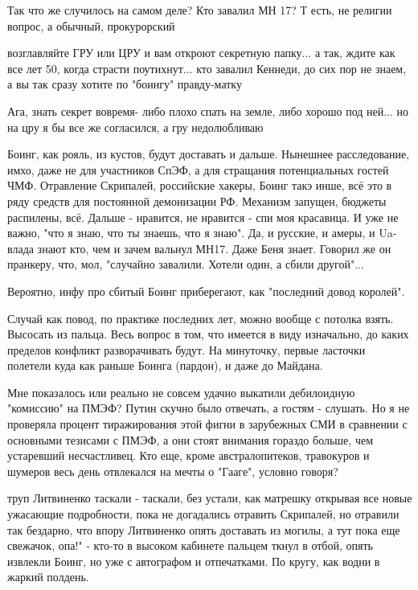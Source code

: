 \begin{itemize}
Так что же случилось на самом деле? Кто завалил МН 17? Т есть, не религии вопрос, а обычный, прокурорский

\begin{itemize} %

возглавляйте ГРУ или ЦРУ и вам откроют секретную папку... а так, ждите как все
лет 50, когда страсти поутихнут... кто завалил Кеннеди, до сих пор не знаем, а
вы так сразу хотите по "боингу" правду-матку

Ага, знать секрет вовремя- либо плохо спать на земле, либо хорошо под ней... но на цру я бы все же согласился, а гру недолюбливаю
\end{itemize} %


Боинг, как рояль, из кустов, будут доставать и дальше. Нынешнее расследование,
имхо, даже не для участников СпЭФ, а для стращания потенциальных гостей ЧМФ.
Отравление Скрипалей, российские хакеры, Боинг такэ инше, всё это в ряду
средств для постоянной демонизации РФ. Механизм запущен, бюджеты распилены,
всё. Дальше - нравится, не нравится - спи моя красавица. И уже не важно, "что я
знаю, что ты знаешь, что я знаю". Да, и русские, и амеры, и Ua-влада знают кто,
чем и зачем вальнул МН17. Даже Беня знает. Говорил же он пранкеру, что, мол,
"случайно завалили. Хотели один, а сбили другой"...

Вероятно, инфу про сбитый Боинг приберегают, как "последний довод королей".


Случай как повод, по практике последних лет, можно вообще с потолка взять.
Высосать из пальца. Весь вопрос в том, что имеется в виду изначально, до каких
пределов конфликт разворачивать будут. На минуточку, первые ласточки полетели
куда как раньше Боинга (пардон), и даже до Майдана.


Мне показалось или реально не совсем удачно выкатили дебилоидную "комиссию" на
ПМЭФ? Путин скучно было отвечать, а гостям - слушать. Но я не проверяла процент
тиражирования этой фигни в зарубежных СМИ в сравнении с основными тезисами с
ПМЭФ, а они стоят внимания гораздо больше, чем устаревший несчастливец. Кто
еще, кроме австралопитеков, травокуров и шумеров весь день отвлекался на мечты
о "Гааге", условно говоря?


труп Литвиненко таскали - таскали, без устали, как матрешку открывая все новые
ужасающие подробности, пока не догадались отравить Скрипалей, но отравили так
бездарно, что впору Литвиненко опять доставать из могилы, а тут пока еще
свежачок, опа!" - кто-то в высоком кабинете пальцем ткнул в отбой, опять
извлекли Боинг, но уже с автографом и отпечатками. По кругу, как водни в жаркий
полдень.


\end{itemize}

